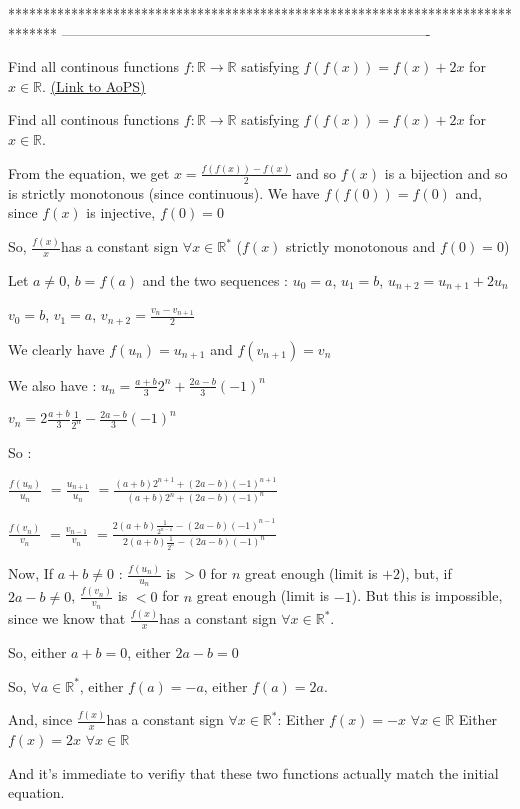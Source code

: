 *******************************************************************************
-------------------------------------------------------------------------------

\begin{problem}
	Find all continous functions $ f: \mathbb{R}\rightarrow \mathbb{R}$ satisfying $ f(f(x))=f(x)+2x$ for $ x\in \mathbb{R}$.
	\flushright \href{https://artofproblemsolving.com/community/c6h271914}{(Link to AoPS)}
\end{problem}



\begin{solution}
	\begin{tcolorbox}Find all continous functions $ f: \mathbb{R}\rightarrow \mathbb{R}$ satisfying $ f(f(x)) = f(x) + 2x$ for $ x\in \mathbb{R}$.\end{tcolorbox}

From the equation, we get $ x=\frac{f(f(x))-f(x)}{2}$ and so $ f(x)$ is a bijection and so is strictly monotonous (since continuous).
We have $ f(f(0))=f(0)$ and, since $ f(x)$ is injective, $ f(0)=0$

So, $ \frac{f(x)}{x}$has a constant sign $ \forall x\in\mathbb{R}^*$ ($ f(x)$ strictly monotonous and $ f(0)=0$)  

Let $ a\neq 0$, $ b=f(a)$ and the two sequences :
$ u_0=a$, $ u_1=b$, $ u_{n+2}=u_{n+1}+2u_n$

$ v_0=b$, $ v_1=a$, $ v_{n+2}=\frac{v_n-v_{n+1}}{2}$

We clearly have $ f(u_n)=u_{n+1}$ and $ f(v_{n+1})=v_n$

We also have : 
$ u_n=\frac{a+b}{3}2^n + \frac{2a-b}{3}(-1)^n$

$ v_n=2\frac{a+b}{3}\frac{1}{2^n} - \frac{2a-b}{3}(-1)^n$

So :

$ \frac{f(u_n)}{u_n}$ $ =\frac{u_{n+1}}{u_n}$ $ =\frac{(a+b)2^{n+1} + (2a-b)(-1)^{n+1}}{(a+b)2^{n} + (2a-b)(-1)^{n}}$

$ \frac{f(v_n)}{v_n}$ $ =\frac{v_{n-1}}{v_n}$ $ =\frac{2(a+b)\frac{1}{2^{n-1}} - (2a-b)(-1)^{n-1}}{2(a+b)\frac{1}{2^{n}} - (2a-b)(-1)^{n}}$

Now, If $ a+b\neq 0$ : $ \frac{f(u_n)}{u_n}$ is $ >0$ for $ n$ great enough (limit is $ +2$), but, if $ 2a-b\neq 0$, $ \frac{f(v_n)}{v_n}$ is $ <0$ for $ n$ great enough (limit is $ -1$). But this is impossible, since we know that $ \frac{f(x)}{x}$has a constant sign $ \forall x\in\mathbb{R}^*$.

So, either $ a+b=0$, either $ 2a-b=0$

So, $ \forall a\in\mathbb{R}^*$, either $ f(a)=-a$, either $ f(a)=2a$.

And, since $ \frac{f(x)}{x}$has a constant sign $ \forall x\in\mathbb{R}^*$:
Either $ f(x)=-x$ $ \forall x\in\mathbb{R}$
Either $ f(x)=2x$ $ \forall x\in\mathbb{R}$

And it's immediate to verifiy that these two functions actually match the initial equation.
\end{solution}

